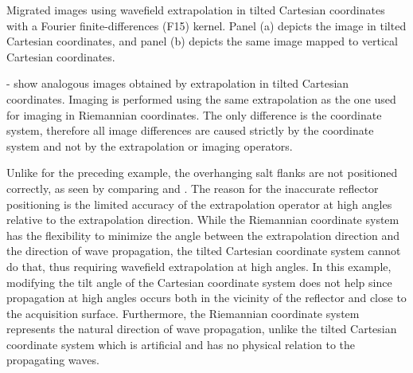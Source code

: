 {Migrated images using wavefield extrapolation in tilted Cartesian coordinates with a Fourier finite-differences (F15) kernel. Panel (a) depicts the image in tilted Cartesian coordinates, and panel (b) depicts the same image mapped to vertical Cartesian coordinates.}

- show analogous images obtained by extrapolation in tilted Cartesian coordinates. Imaging is performed using the same extrapolation as the one used for imaging in Riemannian coordinates. The only difference is the coordinate system, therefore all image differences are caused strictly by the coordinate system and not by the extrapolation or imaging operators. 
\par
Unlike for the preceding example, the overhanging salt flanks are not positioned correctly, as seen by comparing  and . The reason for the inaccurate reflector positioning is the limited accuracy of the extrapolation operator at high angles relative to the extrapolation direction. While the Riemannian coordinate system has the flexibility to minimize the angle between the extrapolation direction and the direction of wave propagation, the tilted Cartesian coordinate system cannot do that, thus requiring wavefield extrapolation at high angles. In this example, modifying the tilt angle of the Cartesian coordinate system does not help since propagation at high angles occurs both in the vicinity of the reflector and close to the acquisition surface. Furthermore, the Riemannian coordinate system represents the natural direction of wave propagation, unlike the tilted Cartesian coordinate system which is artificial and has no physical relation to the propagating waves.


